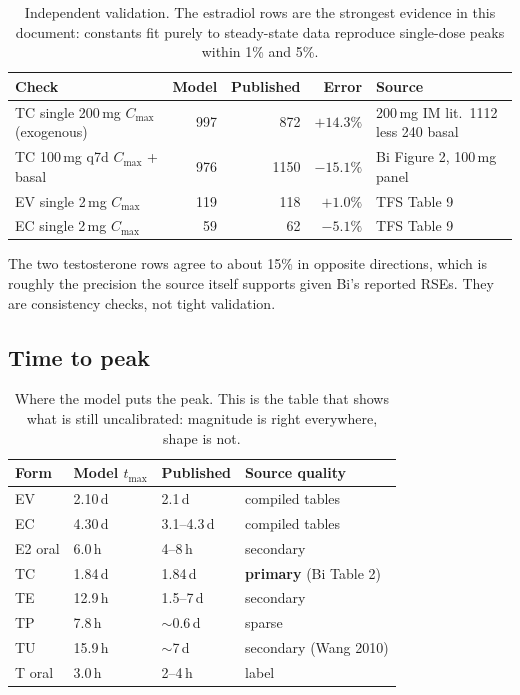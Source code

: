 \documentclass[11pt,a4paper]{article}
\newcommand{\bad}[1]{\textcolor{warn}{#1}}
\newcommand{\good}[1]{\textcolor{ok}{#1}}
\begin{document}
\begin{table}[h]
\centering
\footnotesize
\begin{tabular}{@{}lrrrl@{}}
\toprule
\textbf{Check} & \textbf{Model} & \textbf{Published} & \textbf{Error} & \textbf{Source} \\
\midrule
TC single 200\,mg $C_{\max}$ (exogenous) & 997 & 872 & $+14.3\%$
  & 200\,mg IM lit.\ 1112 less 240 basal \\
TC 100\,mg q7d $C_{\max}$ + basal & 976 & 1150 & $-15.1\%$
  & Bi Figure 2, 100\,mg panel \\
EV single 2\,mg $C_{\max}$ & 119 & 118 & \good{$+1.0\%$} & TFS Table 9 \\
EC single 2\,mg $C_{\max}$ & 59 & 62 & \good{$-5.1\%$} & TFS Table 9 \\
\bottomrule
\end{tabular}
\caption{Independent validation. The estradiol rows are the strongest evidence in
this document: constants fit purely to steady-state data reproduce single-dose
peaks within 1\% and 5\%.}
\end{table}

The two testosterone rows agree to about 15\% in opposite directions, which is
roughly the precision the source itself supports given Bi's reported RSEs. They
are consistency checks, not tight validation.

\subsection{Time to peak}

\begin{table}[h]
\centering
\small
\begin{tabular}{@{}llll@{}}
\toprule
\textbf{Form} & \textbf{Model $t_{\max}$} & \textbf{Published} & \textbf{Source quality} \\
\midrule
EV      & 2.10\,d & 2.1\,d & compiled tables \\
EC      & 4.30\,d & 3.1--4.3\,d & compiled tables \\
E2 oral & \good{6.0\,h} & \good{4--8\,h} & secondary \\
TC      & \good{1.84\,d} & \good{1.84\,d} & \textbf{primary} (Bi Table 2) \\
TE      & \bad{12.9\,h} & \bad{1.5--7\,d} & secondary \\
TP      & \bad{7.8\,h} & \bad{$\sim$0.6\,d} & sparse \\
TU      & \bad{15.9\,h} & \bad{$\sim$7\,d} & secondary (Wang 2010) \\
T oral  & \good{3.0\,h} & \good{2--4\,h} & label \\
\bottomrule
\end{tabular}
\caption{Where the model puts the peak. This is the table that shows what is still
uncalibrated: magnitude is right everywhere, shape is not.}
\label{tab:tmax}
\end{table}
\end{document}
